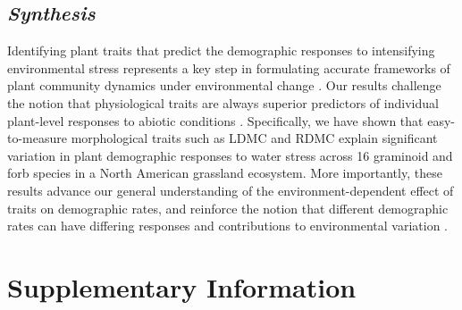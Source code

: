 \documentclass[12pt, letterpaper]{article}
\begin{document}
\subsection{\textit{Synthesis}} Identifying plant traits that predict the demographic responses to intensifying environmental stress represents a key step in formulating accurate frameworks of plant community dynamics under environmental change \cite{Laughlin2020TheFitness}. Our results challenge the notion that physiological traits are always superior predictors of individual plant-level responses to abiotic conditions \cite{Volaire2018}. Specifically, we have shown that easy-to-measure morphological traits such as LDMC and RDMC explain significant variation in plant demographic responses to water stress across 16 graminoid and forb species in a North American grassland ecosystem. More importantly, these results advance our general understanding of the environment-dependent effect of traits on demographic rates, and reinforce the notion that different demographic rates can have differing responses and contributions to environmental variation \cite{Laughlin2020TheFitness}. 



\renewcommand{\thetable}{S\arabic{table}} %
\setcounter{table}{0} %
\renewcommand{\thefigure}{S\arabic{figure}} %
\setcounter{figure}{0} %


\section{Supplementary Information}
\end{document}
